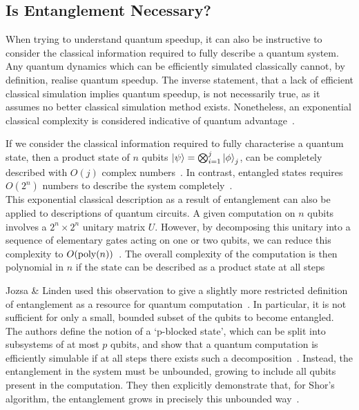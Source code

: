 \documentclass{standalone}
\begin{document}
\subsection{Is Entanglement Necessary?}\label{sec:classicalsim}
When trying to understand quantum speedup, it can also be instructive to consider the classical information required to fully describe a quantum system. Any quantum dynamics which can be efficiently simulated classically cannot, by definition, realise quantum speedup. The inverse statement, that a lack of efficient classical simulation implies quantum speedup, is not necessarily true, as it assumes no better classical simulation method exists. Nonetheless, an exponential classical complexity is considered indicative of quantum advantage~\cite{Jozsa2003}.
\par
If we consider the classical information required to fully characterise a quantum state, then a product state of $n$ qubits $\ket{\psi}=\bigotimes_{i=1}^{j}\ket{\phi}_{j}$, can be completely described with $O(j)$ complex numbers~\cite{Jozsa1997}. In contrast, entangled states requires $O(2^{n})$ numbers to describe the system completely~\cite{Jozsa1997}. \\
This exponential classical description as a result of entanglement can also be applied to descriptions of quantum circuits. A given computation on $n$ qubits involves a $2^{n}\times2^{n}$ unitary matrix $U$. However, by decomposing this unitary into a sequence of elementary gates acting on one or two qubits, we can reduce this complexity to $O(\text{poly}(n))$~\cite{Ekert1998}. The overall complexity of the computation is then polynomial in $n$ if the state can be described as a product state at all steps~\cite{Ekert1998} 
\par
Jozsa \& Linden used this observation to give a slightly more restricted definition of entanglement as a resource for quantum computation~\cite{Jozsa2003}. In particular, it is not sufficient for only a small, bounded subset of the qubits to become entangled. The authors define the notion of a `p-blocked state', which can be split into subsystems of at most $p$ qubits, and show that a quantum computation is efficiently simulable if at all steps there exists such a decomposition~\cite{Jozsa2003}. Instead, the entanglement in the system must be unbounded, growing to include all qubits present in the computation. They then explicitly demonstrate that, for Shor's algorithm, the entanglement grows in precisely this unbounded way~\cite{Jozsa2003}.
\end{document}
